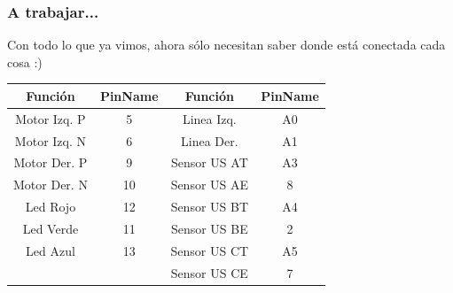 \documentclass[compress]{beamer}
\begin{document}
\begin{frame}
\frametitle{A trabajar...}
Con todo lo que ya vimos, ahora sólo necesitan saber donde está conectada cada cosa :)
\begin{center}
\begin{tabular}{|c|c|c|c|}
\hline
\textbf{Función} & \textbf{PinName} & \textbf{Función} & \textbf{PinName}\\\hline
Motor Izq. P & 5 & Linea Izq. & A0\\\hline
Motor Izq. N & 6 & Linea Der. & A1\\\hline
Motor Der. P & 9 & Sensor US AT & A3\\\hline
Motor Der. N & 10 & Sensor US AE & 8\\\hline
Led Rojo & 12 & Sensor US BT & A4\\\hline
Led Verde & 11 & Sensor US BE & 2\\\hline
Led Azul & 13 & Sensor US CT & A5\\\hline
& & Sensor US CE & 7 \\\hline
\end{tabular}
\end{center}
\end{frame}
\end{document}
